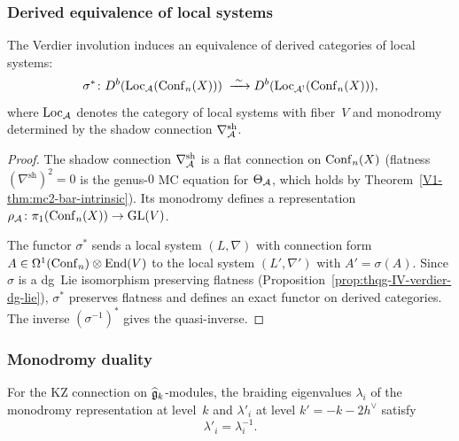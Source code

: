 \subsubsection{Derived equivalence of local systems}

\begin{theorem}
The Verdier involution induces an equivalence of derived categories
of local systems:
\begin{equation}%
\sigma^*\colon
D^b(\Loc_{\cA}(\Conf_n(X)))
\;\xrightarrow{\;\sim\;}
D^b(\Loc_{\cA^!}(\Conf_n(X))),
\end{equation}
where $\operatorname{Loc}_{\mathcal{A}}$ denotes the category of local systems with
fiber~$V$ and monodromy determined by the shadow connection
$\nabla^{\mathrm{sh}}_{\mathcal{A}}$.
\end{theorem}

\begin{proof}
The shadow connection $\nabla^{\mathrm{sh}}_{\mathcal{A}}$ is a flat connection on
$\mathrm{Conf}_n(X)$ (flatness $(\nabla^{\mathrm{sh}})^2 = 0$ is
the genus-$0$ MC equation for $\Theta_{\mathcal{A}}$, which holds by
Theorem~\ref*{V1-thm:mc2-bar-intrinsic}). Its monodromy defines a
representation $\rho_{\mathcal{A}}\colon \pi_1(\mathrm{Conf}_n(X)) \to \mathrm{GL}(V)$.

The functor $\sigma^*$ sends a local system $(L, \nabla)$ with
connection form $A \in \Omega^1(\mathrm{Conf}_n) \otimes \operatorname{End}(V)$ to the
local system $(L', \nabla')$ with $A' = \sigma(A)$. Since $\sigma$
is a dg~Lie isomorphism preserving flatness
(Proposition~\ref{prop:thqg-IV-verdier-dg-lie}), $\sigma^*$ preserves
flatness and defines an exact functor on derived categories.
The inverse $(\sigma^{-1})^*$ gives the quasi-inverse.
\end{proof}

\subsubsection{Monodromy duality}

\begin{proposition}
\label{prop:thqg-IV-monodromy-duality}
For the KZ connection on $\widehat{\mathfrak{g}}_k$-modules, the braiding
eigenvalues $\lambda_i$ of the monodromy representation at level~$k$
and $\lambda'_i$ at level $k' = -k - 2h^\vee$ satisfy
\begin{equation}%
\lambda'_i = \lambda_i^{-1}.
\end{equation}
\end{proposition}

